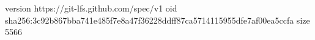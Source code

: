 version https://git-lfs.github.com/spec/v1
oid sha256:3c92b867bba741e485f7e8a47f36228ddff87ca5714115955dfe7af00ea5ccfa
size 5566

